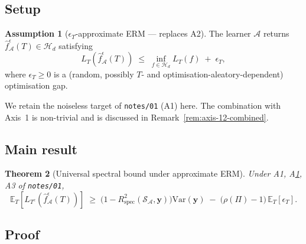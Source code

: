 \documentclass[11pt,a4paper]{article}
\theoremstyle{plain}
\newtheorem{theorem}{Theorem}
\theoremstyle{definition}
\newtheorem{assumption}[theorem]{Assumption}
\theoremstyle{remark}
\newcommand{\by}{\mathbf{y}}
\newcommand{\E}{\mathbb{E}}
\newcommand{\Var}{\mathrm{Var}}
\newcommand{\Rspec}{R^2_{\mathrm{spec}}}
\newcommand{\Scal}{\mathcal{S}}
\newcommand{\Acal}{\mathcal{A}}
\newcommand{\Hcal}{\mathcal{H}}
\begin{document}
\subsection{Setup}

\begin{assumption}[$\epsilon_T$-approximate ERM --- replaces A2]
\label{a:approx-erm}
The learner $\Acal$ returns
$\hat f^{\epsilon}_\Acal(T) \in \Hcal_d$ satisfying
\begin{equation}
    L_T(\hat f^{\epsilon}_\Acal(T))
    \;\le\; \inf_{f \in \Hcal_d} L_T(f) \;+\; \epsilon_T,
    \label{eq:axis-2-suboptimal}
\end{equation}
where $\epsilon_T \ge 0$ is a (random, possibly $T$- and
optimisation-aleatory-dependent) optimisation gap.
\end{assumption}

We retain the noiseless target of \texttt{notes/01} (A1) here. The
combination with Axis~1 is non-trivial and is discussed in
Remark~\ref{rem:axis-12-combined}.

\subsection{Main result}

\begin{theorem}[Universal spectral bound under approximate ERM]
\label{thm:axis-2}
Under A1, A\ref{a:approx-erm}, A3 of \texttt{notes/01},
\begin{equation}
    \E_T\!\left[L_{T^c}(\hat f^{\epsilon}_\Acal(T))\right]
    \;\geq\;
    \big(1 - \Rspec(\Scal_\Acal, \by)\big)\Var(\by)
    \;-\; \big(\rho(\Pi) - 1\big)\, \E_T[\epsilon_T].
    \label{eq:axis-2-main}
\end{equation}
\end{theorem}

\subsection{Proof}
\end{document}
